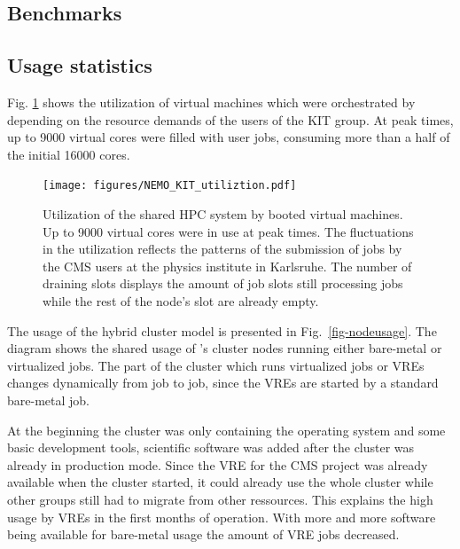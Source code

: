 \subsection{Benchmarks}




%
%
%
\subsection{Usage statistics}
Fig. \ref{fig-frplots} shows the utilization of virtual machines which were orchestrated by \Roced depending on the resource demands of the users of the KIT group.
At peak times, up to 9000 virtual cores were filled with user jobs, consuming more than a half of the initial 16000 \NEMO cores.

\begin{figure}
\begin{center}
  \texttt{[image: figures/NEMO\_KIT\_utiliztion.pdf]}
  \caption{Utilization of the shared HPC system by booted virtual machines. Up to 9000 virtual cores were in use at peak times. The fluctuations in the utilization reflects the patterns of the submission of jobs by the CMS users at the physics institute in Karlsruhe. The number of draining slots displays the amount of job slots still processing jobs while the rest of the node's slot are already empty.}
  \label{fig-frplots}
\end{center}
\end{figure}

The usage of the hybrid cluster model is presented in Fig.~\ref{fig-nodeusage}.
The diagram shows the shared usage of \NEMO's cluster nodes running either
bare-metal or virtualized jobs. The part of the cluster which runs virtualized
jobs or VREs changes dynamically from job to job, since the VREs are started by
a standard bare-metal job.

At the beginning the cluster was only containing the operating system and some
basic development tools, scientific software was added after the cluster was
already in production mode. Since the VRE for the CMS project was already
available when the \NEMO cluster started, it could already use the whole cluster
while other groups still had to migrate from other ressources. This explains the high usage by VREs in the first months of
operation. With more and more software being available for bare-metal usage the
amount of VRE jobs decreased.

